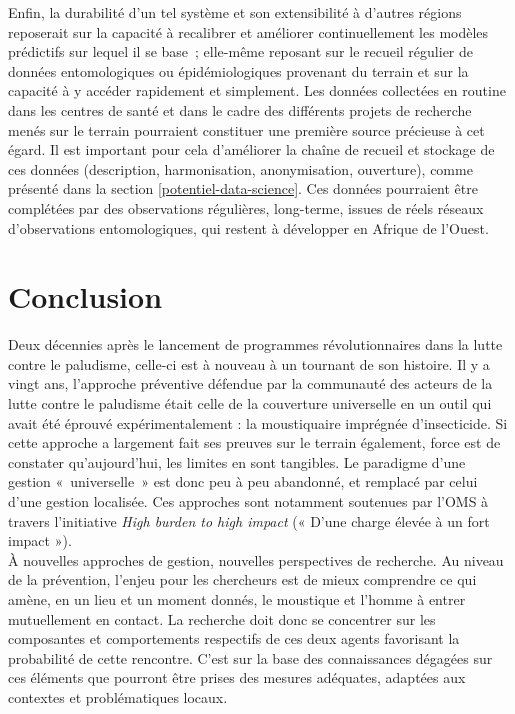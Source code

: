 \documentclass[12pt,twoside]{reedthesis}
\begin{document}
Enfin, la durabilité d'un tel système et son extensibilité à d'autres régions reposerait sur la capacité à recalibrer et améliorer continuellement les modèles prédictifs sur lequel il se base~; elle-même reposant sur le recueil régulier de données entomologiques ou épidémiologiques provenant du terrain et sur la capacité à y accéder rapidement et simplement. Les données collectées en routine dans les centres de santé et dans le cadre des différents projets de recherche menés sur le terrain pourraient constituer une première source précieuse à cet égard. Il est important pour cela d'améliorer la chaîne de recueil et stockage de ces données (description, harmonisation, anonymisation, ouverture), comme présenté dans la section \ref{potentiel-data-science}. Ces données pourraient être complétées par des observations régulières, long-terme, issues de réels réseaux d'observations entomologiques, qui restent à développer en Afrique de l'Ouest.

\hypertarget{conclusion-1}{%
\chapter*{Conclusion}\label{conclusion-1}}

\markboth{}{}

Deux décennies après le lancement de programmes révolutionnaires dans la lutte contre le paludisme, celle-ci est à nouveau à un tournant de son histoire. Il y a vingt ans, l'approche préventive défendue par la communauté des acteurs de la lutte contre le paludisme était celle de la couverture universelle en un outil qui avait été éprouvé expérimentalement : la moustiquaire imprégnée d'insecticide. Si cette approche a largement fait ses preuves sur le terrain également, force est de constater qu'aujourd'hui, les limites en sont tangibles. Le paradigme d'une gestion «~universelle~» est donc peu à peu abandonné, et remplacé par celui d'une gestion localisée. Ces approches sont notamment soutenues par l'OMS à travers l'initiative \emph{High burden to high impact} (« D'une charge élevée à un fort impact »).\\

À nouvelles approches de gestion, nouvelles perspectives de recherche. Au niveau de la prévention, l'enjeu pour les chercheurs est de mieux comprendre ce qui amène, en un lieu et un moment donnés, le moustique et l'homme à entrer mutuellement en contact. La recherche doit donc se concentrer sur les composantes et comportements respectifs de ces deux agents favorisant la probabilité de cette rencontre. C'est sur la base des connaissances dégagées sur ces éléments que pourront être prises des mesures adéquates, adaptées aux contextes et problématiques locaux.\\
\end{document}
